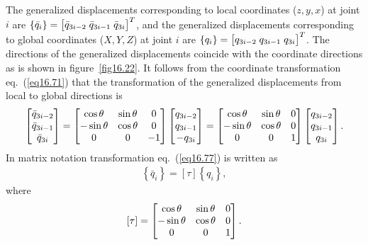 \documentclass{AeroStructure-ERJohnson}
\begin{document}
The generalized displacements corresponding to local coordinates ($z,y,x$) at joint $i$ are $\left\{\bar{q}_{i}\right\}=\left[\begin{array}{@{}l@{\;}l@{\;}l@{}}\bar{q}_{3 i-2} & \bar{q}_{3 i-1} & \bar{q}_{3 i}\end{array}\right]^{T}$, and the generalized displacements corresponding to global coordinates ($X,Y,Z$) at joint $i$ are $\left\{q_{i}\right\}=\left[\begin{array}{@{}l@{\;}l@{\;}l@{}}q_{3 i-2} & q_{3 i-1} & q_{3 i}\end{array}\right]^{T}$. The directions of the generalized displacements coincide with the coordinate directions as is shown in figure~\ref{fig16.22}. It follows from the coordinate transformation eq.~(\ref{eq16.71}) that the transformation of the generalized displacements from local to global directions is
\begin{align}\label{eq16.77}
\left[\begin{array}{@{}c@{}}\bar{q}_{3i-2} \\\bar{q}_{3i-1} \\\bar{q}_{3 i}\end{array}\right]=\left[\begin{array}{@{}ccc@{}}\cos \theta & \sin \theta & 0 \\-\sin \theta & \cos \theta & 0 \\0 & 0 & -1\end{array}\right]\left[\begin{array}{@{}c@{}}q_{3 i-2} \\q_{3 i-1} \\-q_{3 i}\end{array}\right]=\left[\begin{array}{@{}ccc@{}}\cos \theta & \sin \theta & 0 \\-\sin \theta & \cos \theta & 0 \\0 & 0 & 1\end{array}\right]\left[\begin{array}{@{}c@{}}q_{3 i-2} \\q_{3 i-1} \\q_{3 i}\end{array}\right].
\end{align}
In matrix notation transformation eq.~(\ref{eq16.77}) is written as
\begin{align}\label{eq16.78}
\left\{\bar{q}_{i}\right\}=[\tau]\left\{q_{i}\right\},
\end{align}
where
\begin{align}\label{eq16.79}
[\tau]=\left[\begin{array}{@{}ccc@{}}\cos \theta & \sin \theta & 0 \\-\sin \theta & \cos \theta & 0 \\0 & 0 & 1\end{array}\right].
\end{align}
\end{document}
